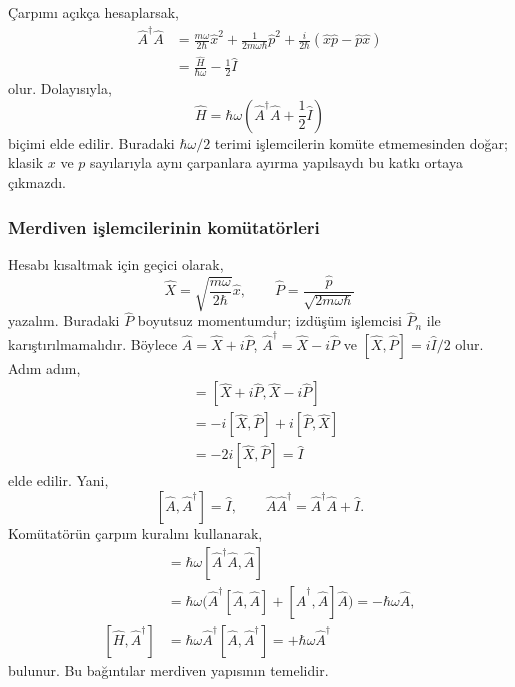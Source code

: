 \documentclass[00_kitap.tex]{subfiles}
\begin{document}
Çarpımı açıkça hesaplarsak,
\begin{align}
 \hat A^\dagger\hat A
 &=\frac{m\omega}{2\hbar}\hat x^2
   +\frac{1}{2m\omega\hbar}\hat p^2
   +\frac{i}{2\hbar}(\hat x\hat p-\hat p\hat x)\\
 &=\frac{\hat H}{\hbar\omega}-\frac12\hat I
 \label{eq:06_adaga_acilim}
\end{align}
olur. Dolayısıyla,
\begin{equation}
 \boxed{\hat H=\hbar\omega
                  \left(\hat A^\dagger\hat A+\frac12\hat I\right)}
 \label{eq:06_ho_carpan}
\end{equation}
biçimi elde edilir. Buradaki $\hbar\omega/2$ terimi işlemcilerin
komüte etmemesinden doğar; klasik $x$ ve $p$ sayılarıyla aynı
çarpanlara ayırma yapılsaydı bu katkı ortaya çıkmazdı.

\subsubsection{Merdiven işlemcilerinin komütatörleri}

Hesabı kısaltmak için geçici olarak,
\begin{equation}
 \hat X=\sqrt{\frac{m\omega}{2\hbar}}\hat x,
 \qquad \hat P=\frac{\hat p}{\sqrt{2m\omega\hbar}}
\end{equation}
yazalım. Buradaki $\hat P$ boyutsuz momentumdur; izdüşüm
işlemcisi $\hat P_n$ ile karıştırılmamalıdır. Böylece
$\hat A=\hat X+i\hat P$, $\hat A^\dagger=\hat X-i\hat P$
ve $[\hat X,\hat P]=i\hat I/2$ olur. Adım adım,
\begin{align}
 [\hat A,\hat A^\dagger]
 &=[\hat X+i\hat P,\hat X-i\hat P]\\
 &=-i[\hat X,\hat P]+i[\hat P,\hat X]\\
 &=-2i[\hat X,\hat P]=\hat I
\end{align}
elde edilir. Yani,
\begin{equation}
 \boxed{[\hat A,\hat A^\dagger]=\hat I,\qquad
 \hat A\hat A^\dagger=\hat A^\dagger\hat A+\hat I.}
 \label{eq:06_aa_komutator}
\end{equation}
Komütatörün çarpım kuralını kullanarak,
\begin{align}
 [\hat H,\hat A]
 &=\hbar\omega[\hat A^\dagger\hat A,\hat A]\\
 &=\hbar\omega\bigl(\hat A^\dagger[\hat A,\hat A]
             +[\hat A^\dagger,\hat A]\hat A\bigr)
 =-\hbar\omega\hat A,\\
 [\hat H,\hat A^\dagger]
 &=\hbar\omega\hat A^\dagger[\hat A,\hat A^\dagger]
 =+\hbar\omega\hat A^\dagger
 \label{eq:06_h_merdiven}
\end{align}
bulunur. Bu bağıntılar merdiven yapısının temelidir.
\end{document}
